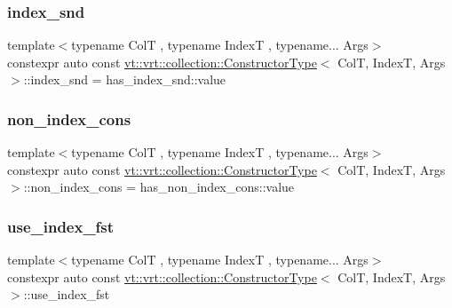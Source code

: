 \subsubsection{\texorpdfstring{index\+\_\+snd}{index\_snd}}
{\footnotesize\ttfamily template$<$typename ColT , typename IndexT , typename... Args$>$ \\
constexpr auto const \hyperlink{structvt_1_1vrt_1_1collection_1_1_constructor_type}{vt\+::vrt\+::collection\+::\+Constructor\+Type}$<$ ColT, IndexT, Args $>$\+::index\+\_\+snd = has\+\_\+index\+\_\+snd\+::value\hspace{0.3cm}{\ttfamily [static]}}

\mbox{\label{structvt_1_1vrt_1_1collection_1_1_constructor_type_a84ceed8f579b40d34fe1cd69d654227d}} 
\subsubsection{\texorpdfstring{non\+\_\+index\+\_\+cons}{non\_index\_cons}}
{\footnotesize\ttfamily template$<$typename ColT , typename IndexT , typename... Args$>$ \\
constexpr auto const \hyperlink{structvt_1_1vrt_1_1collection_1_1_constructor_type}{vt\+::vrt\+::collection\+::\+Constructor\+Type}$<$ ColT, IndexT, Args $>$\+::non\+\_\+index\+\_\+cons = has\+\_\+non\+\_\+index\+\_\+cons\+::value\hspace{0.3cm}{\ttfamily [static]}}

\mbox{\label{structvt_1_1vrt_1_1collection_1_1_constructor_type_ac1ee75d4c1b2cd2c5b89296358460fea}} 
\subsubsection{\texorpdfstring{use\+\_\+index\+\_\+fst}{use\_index\_fst}}
{\footnotesize\ttfamily template$<$typename ColT , typename IndexT , typename... Args$>$ \\
constexpr auto const \hyperlink{structvt_1_1vrt_1_1collection_1_1_constructor_type}{vt\+::vrt\+::collection\+::\+Constructor\+Type}$<$ ColT, IndexT, Args $>$\+::use\+\_\+index\+\_\+fst\hspace{0.3cm}{\ttfamily [static]}}

